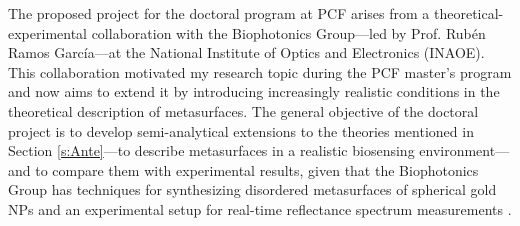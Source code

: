The proposed project for the doctoral program at PCF arises from a theoretical-experimental collaboration with the Biophotonics Group—led by Prof. Rubén Ramos García—at the National Institute of Optics and Electronics (INAOE). This collaboration motivated my research topic during the PCF master's program and now aims to extend it by introducing increasingly realistic conditions in the theoretical description of metasurfaces. The general objective of the doctoral project is to develop semi-analytical extensions to the theories mentioned in Section \ref{s:Ante}—to describe metasurfaces in a realistic biosensing environment—and to compare them with experimental results, given that the Biophotonics Group has techniques for synthesizing disordered metasurfaces of spherical gold NPs and an experimental setup for real-time reflectance spectrum measurements \cite{cuanalo_sensitivity_2022}.

